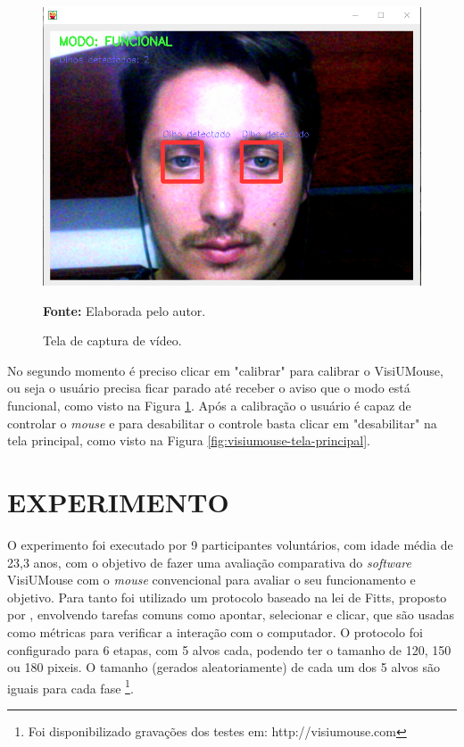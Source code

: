\begin{figure}[htbp]
\caption{Tela de captura de vídeo.} 
\centering \includegraphics[scale=.35]{img/visiumouse-tela-captura-video.png}

{\fontsize{11}{11}\selectfont \textbf{Fonte:} Elaborada pelo autor.}
\label{fig:visiumouse-tela-captura-video}
\end{figure}

No segundo momento é preciso clicar em "calibrar" para calibrar o VisiUMouse, ou seja o usuário precisa ficar parado até receber o aviso que o modo está funcional, como visto na Figura \ref{fig:visiumouse-tela-captura-video}. Após a calibração o usuário é capaz de controlar o \textit{mouse} e para desabilitar o controle basta clicar em "desabilitar" na tela principal, como visto na Figura \ref{fig:visiumouse-tela-principal}.

\chapter{EXPERIMENTO}\label{CAP7}


O experimento foi executado por 9 participantes voluntários, com idade média de 23,3 anos, com o objetivo de fazer uma avaliação comparativa do \textit{software} VisiUMouse com o \textit{mouse} convencional para avaliar o seu funcionamento e objetivo. Para tanto foi utilizado um protocolo baseado na lei de Fitts, proposto por , envolvendo tarefas comuns como apontar, selecionar e clicar, que são usadas como métricas para verificar a interação com o computador. O protocolo foi configurado para 6 etapas, com 5 alvos cada, podendo ter o tamanho de 120, 150 ou 180 pixeis. O tamanho (gerados aleatoriamente) de cada um dos 5 alvos são iguais para cada fase \footnote{Foi disponibilizado gravações dos testes em: http://visiumouse.com}.

